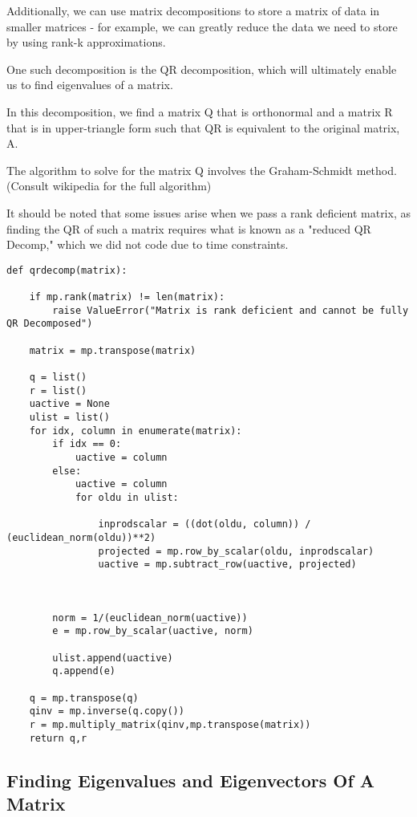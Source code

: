 \documentclass[12pt, a4paper]{article}
\begin{document}
Additionally, we can use matrix decompositions to store a matrix of data in smaller matrices - for example, we can greatly reduce the data we need to store
by using rank-k approximations. 

One such decomposition is the QR decomposition, which will ultimately enable us to find eigenvalues of a matrix.

In this decomposition, we find a matrix Q that is orthonormal and a matrix R that is in upper-triangle form such that QR is equivalent to the original matrix, A. 

The algorithm to solve for the matrix Q involves the Graham-Schmidt method. (Consult wikipedia for the full algorithm)

It should be noted that some issues arise when we pass a rank deficient matrix, as finding the QR of such a matrix requires what is known 
as a "reduced QR Decomp," which we did not code due to time constraints. 

\begin{lstlisting}
def qrdecomp(matrix):

    if mp.rank(matrix) != len(matrix):
        raise ValueError("Matrix is rank deficient and cannot be fully QR Decomposed")
    
    matrix = mp.transpose(matrix)

    q = list()
    r = list()
    uactive = None
    ulist = list()
    for idx, column in enumerate(matrix):
        if idx == 0:
            uactive = column
        else:
            uactive = column
            for oldu in ulist:

                inprodscalar = ((dot(oldu, column)) / (euclidean_norm(oldu))**2)
                projected = mp.row_by_scalar(oldu, inprodscalar)
                uactive = mp.subtract_row(uactive, projected)

        

        norm = 1/(euclidean_norm(uactive))
        e = mp.row_by_scalar(uactive, norm)

        ulist.append(uactive)
        q.append(e)

    q = mp.transpose(q)
    qinv = mp.inverse(q.copy())
    r = mp.multiply_matrix(qinv,mp.transpose(matrix))
    return q,r 

\end{lstlisting}

\subsection{Finding Eigenvalues and Eigenvectors Of A Matrix}
\end{document}
